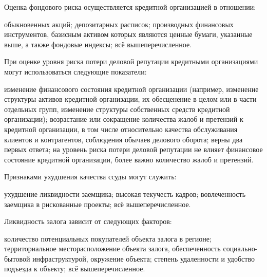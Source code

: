 \documentclass[12pt, table]{exam}
\begin{document}
\begin{questions}
\begin{multicols}{2}
\question Оценка фондового риска осуществляется кредитной организацией в отношении:
	 \begin{choices}
	 \choice обыкновенных акций;
	 \choice депозитарных расписок;
	 \CC производных финансовых инструментов, базисным активом которых являются ценные бумаги, указанные выше, а также фондовые индексы;
	 \choice всё вышеперечисленное.
	 \end{choices}
\question При оценке уровня риска потери деловой репутации кредитными организациями могут использоваться следующие показатели:
	 \begin{choices}
	 \CC изменение финансового состояния кредитной организации (например, изменение структуры активов кредитной организации, их обесценение в целом или в части отдельных групп, изменение структуры собственных средств кредитной организации);
	 \choice возрастание или сокращение количества жалоб и претензий к кредитной организации, в том числе относительно качества обслуживания клиентов и контрагентов, соблюдения обычаев делового оборота;
	 \choice верны два первых ответа;
	 \choice на уровень риска потери деловой репутации не влияет финансовое состояние кредитной организации, более важно количество жалоб и претензий.
	 \end{choices}
\question Признаками ухудшения качества ссуды могут служить:
	 \begin{choices}
	 \CC ухудшение ликвидности заемщика;
	 \choice высокая текучесть кадров;
	 \choice вовлеченность заемщика в рискованные проекты;
	 \choice всё вышеперечисленное.
	 \end{choices}
\question Ликвидность залога зависит от следующих факторов:
	 \begin{choices}
	 \choice количество потенциальных покупателей объекта залога в регионе;
	 \CC территориальное месторасположение объекта залога, обеспеченность социально-бытовой инфраструктурой, окружение объекта;
	 \choice степень удаленности и удобство подъезда к объекту;
	 \choice всё вышеперечисленное.
	 \end{choices}


\end{multicols}
\end{questions}
\end{document}
